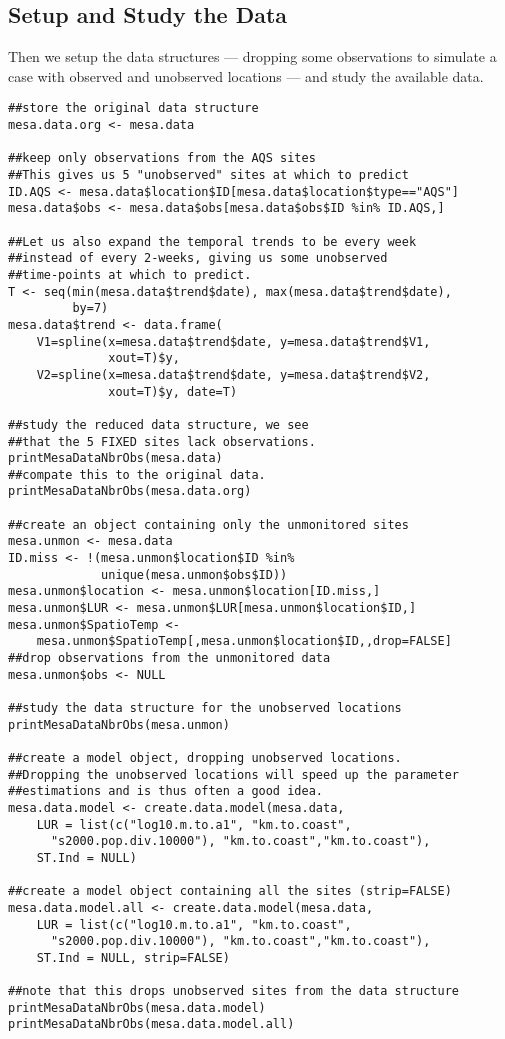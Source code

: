 \subsection{Setup and Study the Data}
Then we setup the data structures --- dropping some observations to simulate 
a case with observed and unobserved locations --- and study the 
available data.
\vspace*{-0.5\baselineskip}
\begin{verbatim}
##store the original data structure
mesa.data.org <- mesa.data

##keep only observations from the AQS sites
##This gives us 5 "unobserved" sites at which to predict
ID.AQS <- mesa.data$location$ID[mesa.data$location$type=="AQS"]
mesa.data$obs <- mesa.data$obs[mesa.data$obs$ID %in% ID.AQS,]

##Let us also expand the temporal trends to be every week
##instead of every 2-weeks, giving us some unobserved 
##time-points at which to predict.
T <- seq(min(mesa.data$trend$date), max(mesa.data$trend$date),
         by=7)
mesa.data$trend <- data.frame(
    V1=spline(x=mesa.data$trend$date, y=mesa.data$trend$V1, 
              xout=T)$y, 
    V2=spline(x=mesa.data$trend$date, y=mesa.data$trend$V2, 
              xout=T)$y, date=T)

##study the reduced data structure, we see 
##that the 5 FIXED sites lack observations.
printMesaDataNbrObs(mesa.data)
##compate this to the original data.
printMesaDataNbrObs(mesa.data.org)

##create an object containing only the unmonitored sites
mesa.unmon <- mesa.data
ID.miss <- !(mesa.unmon$location$ID %in% 
             unique(mesa.unmon$obs$ID))
mesa.unmon$location <- mesa.unmon$location[ID.miss,]
mesa.unmon$LUR <- mesa.unmon$LUR[mesa.unmon$location$ID,]
mesa.unmon$SpatioTemp <- 
    mesa.unmon$SpatioTemp[,mesa.unmon$location$ID,,drop=FALSE]
##drop observations from the unmonitored data
mesa.unmon$obs <- NULL

##study the data structure for the unobserved locations
printMesaDataNbrObs(mesa.unmon)

##create a model object, dropping unobserved locations.
##Dropping the unobserved locations will speed up the parameter 
##estimations and is thus often a good idea.
mesa.data.model <- create.data.model(mesa.data,
    LUR = list(c("log10.m.to.a1", "km.to.coast", 
      "s2000.pop.div.10000"), "km.to.coast","km.to.coast"),
    ST.Ind = NULL)

##create a model object containing all the sites (strip=FALSE)
mesa.data.model.all <- create.data.model(mesa.data,
    LUR = list(c("log10.m.to.a1", "km.to.coast", 
      "s2000.pop.div.10000"), "km.to.coast","km.to.coast"),
    ST.Ind = NULL, strip=FALSE)

##note that this drops unobserved sites from the data structure
printMesaDataNbrObs(mesa.data.model)
printMesaDataNbrObs(mesa.data.model.all)
\end{verbatim}

